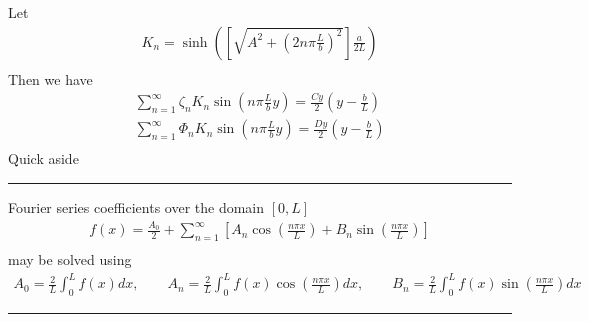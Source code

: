 \documentclass[11pt]{article}
\begin{document}
Let
\begin{equation}\begin{aligned}
K_n = \sinh \left( \left[\sqrt{A^2 + \left(2 n \pi \frac{L}{b} \right)^2}\right] \frac{a}{2L} \right) \\
\end{aligned} \end{equation}
Then we have
\begin{equation}\begin{aligned}
\sum_{n=1}^{\infty} \zeta_n K_n \sin \left(n \pi \frac{L}{b} y \right) = \frac{C y}{2} \left(y - \frac{b}{L}\right) \\
\sum_{n=1}^{\infty} \Phi_n  K_n \sin \left(n \pi \frac{L}{b} y \right) = \frac{D y}{2} \left(y - \frac{b}{L}\right) \\
\end{aligned} \end{equation}
Quick aside

\noindent \rule{\textwidth}{1pt}
Fourier series coefficients over the domain $[0,L]$
\begin{equation}\begin{aligned}
f(x) = \frac{A_0}{2} + \sum_{n=1}^{\infty} \left[ A_n \cos\left( \frac{n \pi x}{L} \right) + B_n \sin\left( \frac{n \pi x}{L} \right) \right] \\
\end{aligned} \end{equation}
may be solved using
\begin{equation}\begin{aligned}
A_0 = \frac{2}{L} \int_0^L f(x) dx, \qquad
A_n = \frac{2}{L} \int_0^L f(x) \cos\left( \frac{n \pi x}{L} \right) dx, \qquad
B_n = \frac{2}{L} \int_0^L f(x) \sin\left( \frac{n \pi x}{L} \right) dx
\end{aligned} \end{equation}
\noindent \rule{\textwidth}{1pt}
\end{document}

